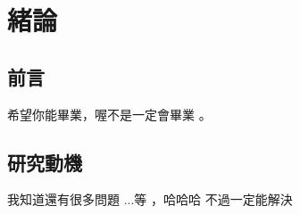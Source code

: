 
\chapter{緒論}\label{1}


\section{前言}\label{1-1}
希望你能畢業\cite{m5}，喔不是一定會畢業 \cite{m4}。

\newpage

\section{研究動機}\label{1-2}
我知道還有很多問題 \cite{m1}...等 \cite{m2} ，哈哈哈 \cite{m3} 不過一定能解決

\newpage




		


